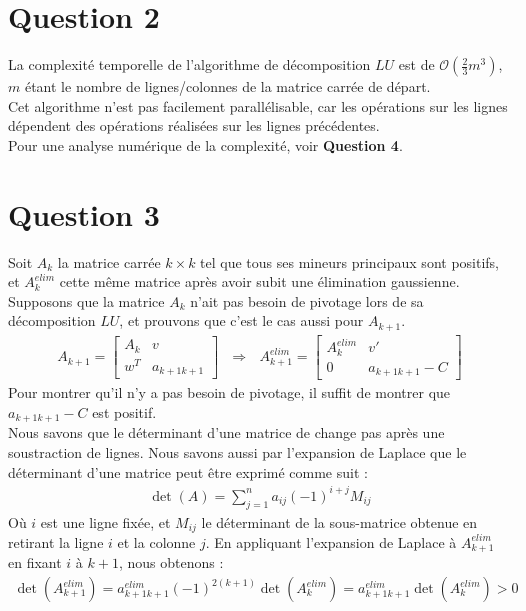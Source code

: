 \documentclass[11pt]{article}
\begin{document}
\section*{Question 2}
La complexité temporelle de l'algorithme de décomposition $LU$ est de $\mathcal{O}(\frac{2}{3}m^3)$, $m$ étant le nombre de lignes/colonnes de la matrice carrée de départ.\\
Cet algorithme n'est pas facilement parallélisable, car les opérations sur les lignes dépendent des opérations réalisées sur les lignes précédentes.\\
Pour une analyse numérique de la complexité, voir \textbf{Question 4}.


\section*{Question 3}
Soit $A_k$ la matrice carrée $k\times k$ tel que tous ses mineurs principaux sont positifs, et $A_k^{elim}$ cette même matrice après avoir subit une élimination gaussienne.\\
Supposons que la matrice $A_k$ n'ait pas besoin de pivotage lors de sa décomposition $LU$, et prouvons que c'est le cas aussi pour $A_{k+1}$.\\
\begin{align}
    A_{k+1} = \left[\begin{array}{cc}
        A_k & v\\
        w^T & a_{k+1k+1}
    \end{array}\right] ~~~ \Rightarrow ~~~
    A_{k+1}^{elim} = \left[\begin{array}{cc}
        A_k^{elim} & v'\\
        0 & a_{k+1k+1} - C
    \end{array}\right]
\end{align}
Pour montrer qu'il n'y a pas besoin de pivotage, il suffit de montrer que $a_{k+1k+1} - C$ est positif.\\
Nous savons que le déterminant d'une matrice de change pas après une soustraction de lignes. Nous savons aussi par l'expansion de Laplace que le déterminant d'une matrice peut être exprimé comme suit :
\begin{align}
    \det(A) = \sum_{j=1}^{n}a_{ij}(-1)^{i+j}M_{ij}
\end{align}
Où $i$ est une ligne fixée, et $M_{ij}$ le déterminant de la sous-matrice obtenue en retirant la ligne $i$ et la colonne $j$. En appliquant l'expansion de Laplace à $A_{k+1}^{elim}$ en fixant $i$ à $k+1$, nous obtenons :
\begin{align}
    \det(A_{k+1}^{elim}) = a^{elim}_{k+1k+1}(-1)^{2(k+1)}\det(A_k^{elim}) = a^{elim}_{k+1k+1}\det(A_k^{elim}) > 0
\end{align}
\end{document}
